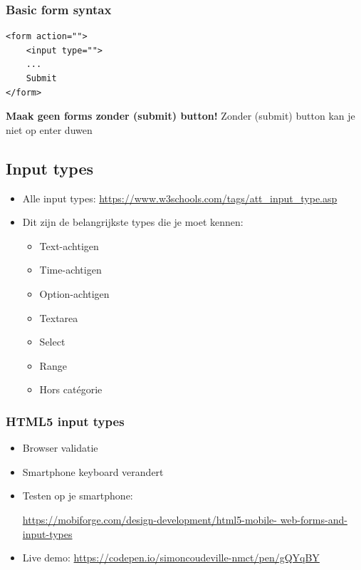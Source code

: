 \documentclass{article}
\newcommand{\bold}[1]{\textbf{#1}}
\begin{document}
\subsubsection{Basic form syntax}

\begin{verbatim}
<form action="">
    <input type="">
    ...
    Submit
</form>
\end{verbatim}

\bold{Maak geen forms zonder (submit) button!} Zonder (submit) button kan je niet op enter duwen

\subsection{Input types}

\begin{itemize}
    \item Alle input types: \url{https://www.w3schools.com/tags/att_input_type.asp}
    \item Dit zijn de belangrijkste types die je moet kennen:
    \begin{itemize}
        \item Text-achtigen
        \item Time-achtigen
        \item Option-achtigen
        \item Textarea
        \item Select
        \item Range
        \item Hors catégorie
    \end{itemize} 
\end{itemize}

\subsubsection{HTML5 input types}

\begin{itemize}
    \item Browser validatie
    \item Smartphone keyboard verandert
    \item Testen op je smartphone: 
    
    \url{https://mobiforge.com/design-development/html5-mobile-
    web-forms-and-input-types}
    \item Live demo: \url{https://codepen.io/simoncoudeville-nmct/pen/gQYqBY}
\end{itemize}
\end{document}
